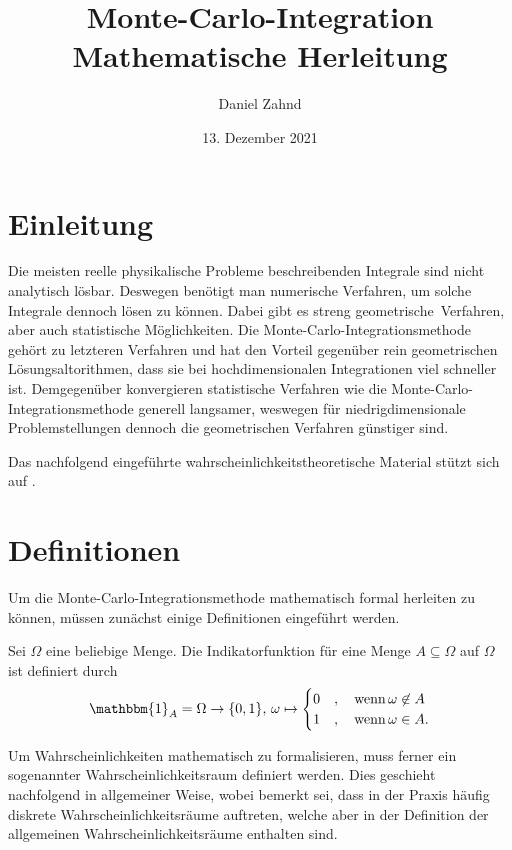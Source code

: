 \documentclass[a4paper,12pt]{article}
\title{Monte-Carlo-Integration \\ \vspace{0.3cm} \small Mathematische Herleitung}
\author{Daniel Zahnd}
\date{13. Dezember 2021}
\begin{document}
\maketitle

\section{Einleitung}
Die meisten reelle physikalische Probleme beschreibenden Integrale sind nicht analytisch lösbar. Deswegen benötigt man numerische Verfahren, um solche Integrale dennoch lösen zu können. Dabei gibt es streng \flqq geometrische\frqq\ Verfahren, aber auch statistische Möglichkeiten. Die Monte-Carlo-Integrationsmethode gehört zu letzteren Verfahren und hat den Vorteil gegenüber rein geometrischen Lösungsaltorithmen, dass sie bei hochdimensionalen Integrationen viel schneller ist. Demgegenüber konvergieren statistische Verfahren wie die Monte-Carlo-Integrationsmethode generell langsamer, weswegen für niedrigdimensionale Problemstellungen dennoch die geometrischen Verfahren günstiger sind.

Das nachfolgend eingeführte wahrscheinlichkeitstheoretische Material stützt sich auf \cite{Molchanov.2017}.

\section{Definitionen}
Um die Monte-Carlo-Integrationsmethode mathematisch formal herleiten zu können, müssen zunächst einige Definitionen eingeführt werden.
\begin{dn}[Indikatorfunktion]\label{Indikatorfunktion}
Sei $\Omega$ eine beliebige Menge. Die Indikatorfunktion für eine Menge $A \subseteq \Omega$ auf $\Omega$ ist definiert durch \begin{equation} \mathbbm{1}_A = \Omega \rightarrow \{0,1\}, \, \omega \mapsto \begin{cases} 0&,\quad \mathrm{wenn}\, \omega \not\in A \\ 1&,\quad \mathrm{wenn}\, \omega \in A.\end{cases}\end{equation}
\end{dn}

Um Wahrscheinlichkeiten mathematisch zu formalisieren, muss ferner ein sogenannter Wahrscheinlichkeitsraum definiert werden. Dies geschieht nachfolgend in allgemeiner Weise, wobei bemerkt sei, dass in der Praxis häufig diskrete Wahrscheinlichkeitsräume auftreten, welche aber in der Definition der allgemeinen Wahrscheinlichkeitsräume enthalten sind.
\end{document}
